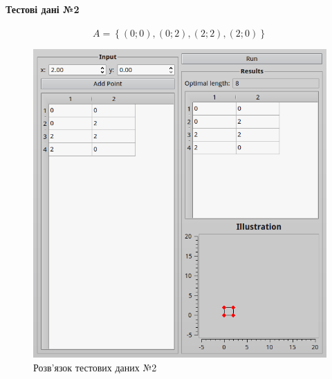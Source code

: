 \documentclass[a4paper,12pt,notitlepage,pdftex]{scrartcl}
\begin{document}
\paragraph{Тестові дані №2}
\begin{equation}
  A = \left\{ \left( 0; 0 \right), \left( 0; 2 \right), \left( 2; 2
  \right), \left( 2; 0 \right) \right\}
  \label{eq:t2}
\end{equation}
\begin{figure}[h!]
  \centering
  \includegraphics[width=\textwidth]{scr2.png}
  \caption{Розв’язок тестових даних №2}
  \label{fig:f2}
\end{figure}
\end{document}

